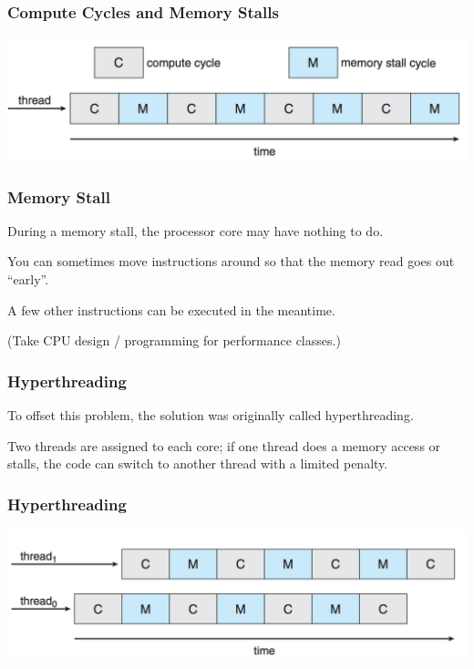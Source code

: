 \begin{frame}
\frametitle{Compute Cycles and Memory Stalls}

\begin{center}
	\includegraphics[width=\textwidth]{images/memory-stall.png}
\end{center}

\end{frame}

\begin{frame}
\frametitle{Memory Stall}

During a memory stall, the processor core may have nothing to do. 

You can sometimes move instructions around so that the memory read goes out ``early''.

A few other instructions can be executed in the meantime. 

(Take CPU design / programming for performance classes.)

\end{frame}

\begin{frame}
\frametitle{Hyperthreading}

To offset this problem, the solution was originally called \alert{hyperthreading}.

Two threads are assigned to each core; if one thread does a memory access or stalls, the code can switch to another thread with a limited penalty. 

\end{frame}

\begin{frame}
\frametitle{Hyperthreading}

\begin{center}
	\includegraphics[width=\textwidth]{images/hyperthreading.png}
\end{center}

\end{frame}

